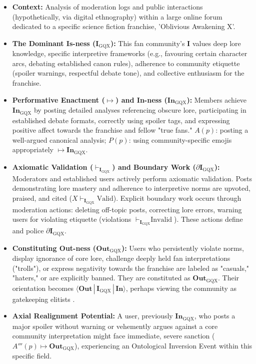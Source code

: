 \documentclass{article}
\newcommand{\Isness}{\mathbf{I}}            %
\newcommand{\Inness}{\mathbf{In}}           %
\newcommand{\Outness}{\mathbf{Out}}         %
\newcommand{\enactment}{\ensuremath{\mapsto}} %
\newcommand{\validates}[1]{\ensuremath{\vdash_{#1}}} %
\newcommand{\boundary}[1]{\ensuremath{\partial #1}} %
\newcommand{\orientation}[3]{\ensuremath{\langle #1 \,|\, #2 \,|\, #3 \rangle}} %
\begin{document}
\begin{itemize}
    \item \textbf{Context:} Analysis of moderation logs and public interactions (hypothetically, via digital ethnography) within a large online forum dedicated to a specific science fiction franchise, 'Oblivious Awakening X'.
    \item \textbf{The Dominant Is-ness ($\Isness_{\text{GQX}}$):} This fan community's $\Isness$ values deep lore knowledge, specific interpretive frameworks (e.g., favouring certain character arcs, debating established canon rules), adherence to community etiquette (spoiler warnings, respectful debate tone), and collective enthusiasm for the franchise.
    \item \textbf{Performative Enactment ($\enactment$) and In-ness ($\Inness_{\text{GQX}}$):} Members achieve $\Inness_{\text{GQX}}$ by posting detailed analyses referencing obscure lore, participating in established debate formats, correctly using spoiler tags, and expressing positive affect towards the franchise and fellow "true fans." $A(p)$: posting a well-argued canonical analysis; $P(p)$: using community-specific emojis appropriately $\enactment \Inness_{\text{GQX}}$.
    \item \textbf{Axiomatic Validation ($\validates{\Isness_{\text{GQX}}}$) and Boundary Work ($\boundary{\Isness_{\text{GQX}}}$):} Moderators and established users actively perform axiomatic validation. Posts demonstrating lore mastery and adherence to interpretive norms are upvoted, praised, and cited ($X \validates{\Isness_{\text{GQX}}} \text{Valid}$). Explicit boundary work occurs through moderation actions: deleting off-topic posts, correcting lore errors, warning users for violating etiquette (violations $\validates{\Isness_{\text{GQX}}} \text{Invalid}$). These actions define and police $\boundary{\Isness_{\text{GQX}}}$.
    \item \textbf{Constituting Out-ness ($\Outness_{\text{GQX}}$):} Users who persistently violate norms, display ignorance of core lore, challenge deeply held fan interpretations ("trolls"), or express negativity towards the franchise are labeled as "casuals," "haters," or are explicitly banned. They are constituted as $\Outness_{\text{GQX}}$. Their orientation becomes $\orientation{\Outness}{\Isness_{\text{GQX}}}{\Inness}$, perhaps viewing the community as gatekeeping elitists \citep{Bourdieu1984}.
    \item \textbf{Axial Realignment Potential:} A user, previously $\Inness_{\text{GQX}}$, who posts a major spoiler without warning or vehemently argues against a core community interpretation might face immediate, severe sanction ($A'''(p) \enactment \Outness_{\text{GQX}}$), experiencing an Ontological Inversion Event within this specific field.

\end{itemize}
\end{document}
